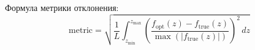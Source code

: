 \documentclass{article}%
\begin{document}
%
\normalsize%
Формула метрики отклонения:%
\[%
\text{metric} = \sqrt{\frac{1}{L} \int_{z_{\min}}^{z_{\max}} \left( \frac{f_{\text{opt}}(z) - f_{\text{true}}(z)}{\max(|f_{\text{true}}(z)|)} \right)^2 \, dz}%
\]%
\end{document}
